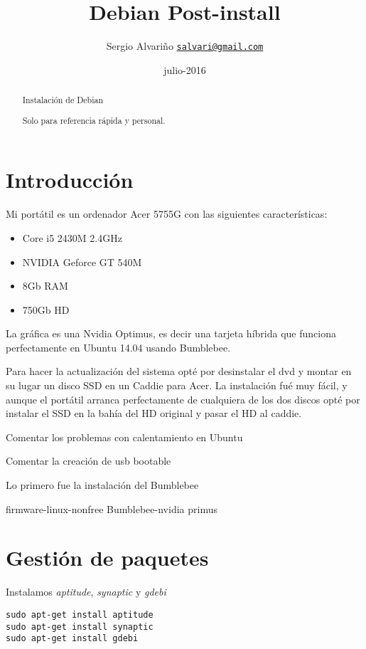 \documentclass[12pt,spanish,]{article}
\title{Debian Post-install}
\author{Sergio Alvariño
\href{mailto:salvari@gmail.com}{\nolinkurl{salvari@gmail.com}}}
\date{julio-2016}
\begin{document}
\maketitle
\begin{abstract}
Instalación de Debian

Solo para referencia rápida y personal.
\end{abstract}

{
\hypersetup{linkcolor=black}
\setcounter{tocdepth}{3}
\tableofcontents
}
\section{Introducción}\label{introducciuxf3n}

Mi portátil es un ordenador Acer 5755G con las siguientes
características:

\begin{itemize}
\item
  Core i5 2430M 2.4GHz
\item
  NVIDIA Geforce GT 540M
\item
  8Gb RAM
\item
  750Gb HD
\end{itemize}

La gráfica es una Nvidia Optimus, es decir una tarjeta híbrida que
funciona perfectamente en Ubuntu 14.04 usando Bumblebee.

Para hacer la actualización del sistema opté por desinstalar el dvd y
montar en su lugar un disco SSD en un Caddie para Acer. La instalación
fué muy fácil, y aunque el portátil arranca perfectamente de cualquiera
de los dos discos opté por instalar el SSD en la bahía del HD original y
pasar el HD al caddie.

Comentar los problemas con calentamiento en Ubuntu

Comentar la creación de usb bootable

Lo primero fue la instalación del Bumblebee

firmware-linux-nonfree Bumblebee-nvidia primus

\section{Gestión de paquetes}\label{gestiuxf3n-de-paquetes}

Instalamos \emph{aptitude}, \emph{synaptic} y \emph{gdebi}

\begin{verbatim}
sudo apt-get install aptitude
sudo apt-get install synaptic
sudo apt-get install gdebi
\end{verbatim}
\end{document}
